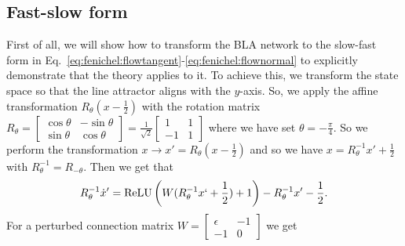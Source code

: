 \documentclass{article} %
\newcounter{ct}
\theoremstyle{definition}
\theoremstyle{remark}
\begin{document}
\subsection{Fast-slow form}\label{sec:supp:fast_slow_form}
First of all, we will show how to transform the BLA network to the slow-fast form in Eq.~\ref{eq:fenichel:flowtangent}-\ref{eq:fenichel:flownormal} to explicitly demonstrate that the theory applies to it.
To achieve this, we transform the state space so that the line attractor aligns with the \(y\)-axis.
So, we apply the affine transformation \(R_{\theta}(x-\frac{1}{2})\) with the rotation matrix \(R_{\theta} = \begin{bmatrix}\cos\theta &-\sin\theta\\\sin\theta&\cos\theta\end{bmatrix}= \frac{1}{\sqrt{2}}\begin{bmatrix}1 &1\\-1&1\end{bmatrix}\) where we have set \(\theta=-\frac{\pi}{4}\).
So we perform the transformation \(x\rightarrow x'= R_{\theta}(x-\frac{1}{2})\) and so we have \(x = R_{\theta}^{-1} x'+\frac{1}{2}\) with \(R_{\theta}^{-1} = R_{-\theta}\).
Then we get that
\begin{align}
R_{\theta}^{-1}\dot x' = \operatorname{ReLU}\left(W(R_{\theta}^{-1} x`+\frac{1}{2})+1\right)-R_{\theta}^{-1} x'-\frac{1}{2}.
\end{align}For a perturbed connection matrix \(W=\begin{bmatrix}\epsilon &-1\\-1&0\end{bmatrix}\) we get
\end{document}
